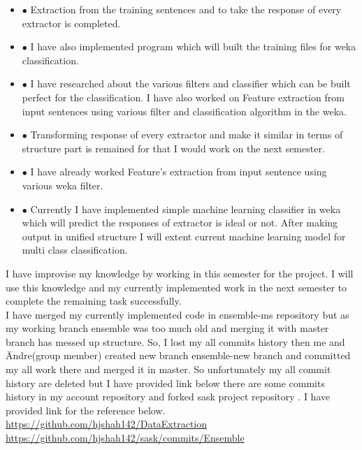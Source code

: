 \documentclass{llncs}
\begin{document}
 \begin {itemize}

\item[$\bullet$ ] Extraction from the training sentences and to take the response of every extractor is completed. 
\item[$\bullet$ ] I have also implemented program which will built the training files for weka classification. 
\item[$\bullet$ ] I have researched about the various filters and classifier which can be built perfect for the classification. I have also worked on Feature extraction from input sentences using various filter and classification algorithm in the weka.
\item[$\bullet$ ] Transforming response of every extractor and make it similar in terms of structure part is remained for that I would work on the next semester.  
\item[$\bullet$ ]  I have already worked Feature’s extraction from input sentence using various weka filter.
\item[$\bullet$ ] Currently I have implemented simple machine learning classifier in weka which will predict the responses of extractor is ideal or not. After making output in unified structure I will extent current machine learning model for multi class classification. 

\end{itemize}
 I have improvise my  knowledge by working in this semester for the project. I will use this knowledge  and my currently implemented work  in the next semester to complete the remaining task successfully.\\
 I have merged my currently implemented code in ensemble-ms repository but as my working branch ensemble was too much old and merging it with master branch has messed up structure. So, I lost my all commits history then  me and  Ändre(group member) created new branch ensemble-new branch and committed my all work there and merged it in master. So unfortunately my all commit history are deleted  but I have provided link below there are some commits history in my account repository and forked sask  project repository . I have provided link for the reference below.\\
\color{blue}
\url{https://github.com/hjshah142/DataExtraction}\\
\url{https://github.com/hjshah142/sask/commits/Ensemble}\\
\color{black}
\end{document}
